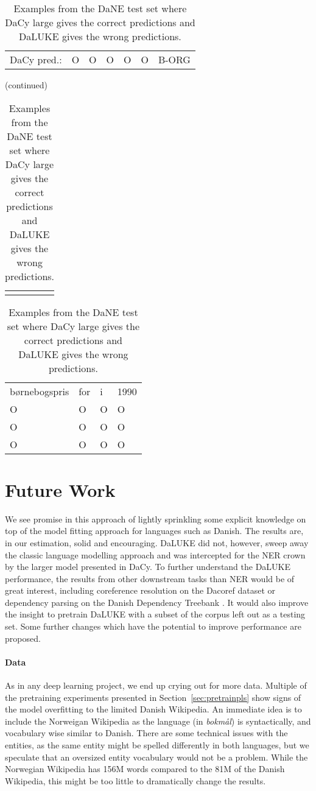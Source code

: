 \documentclass[main.tex]{subfiles}
\begin{document}
\begin{table}[H]
\begin{tabular}{l|llllll}
        DaCy pred.:   & O    & O       & O    & O  & O       & B-ORG
    \end{tabular}
    (continued)\\
    \begin{tabular}{c} %
        \quad \quad \quad \quad \quad \quad \quad \quad \quad \quad \quad
    \end{tabular}
    \begin{tabular}{llll}
        børnebogspris  & for  & i  & 1990  \\
        O              & O    & O  & O     \\\hline
        O              & O    & O  & O     \\
        O              & O    & O  & O
    \end{tabular}
    \caption{
        Examples from the DaNE test set where DaCy large gives the correct predictions and DaLUKE gives the wrong predictions.
    }
    \label{tab:dacyex}
\end{table}\noindent

\section{Future Work}
We see promise in this approach of lightly sprinkling some explicit knowledge on top of the model fitting approach for languages such as Danish.
The results are, in our estimation, solid and encouraging.
DaLUKE did not, however, sweep away the classic language modelling approach and was intercepted for the NER crown by the larger model presented in DaCy.
To further understand the DaLUKE performance, the results from other downstream tasks than NER would be of great interest, including coreference resolution on the Dacoref dataset \cite{kromann2004cdt, danlp2021} or dependency parsing on the Danish Dependency Treebank \cite{kromann2003ddt}.
It would also improve the insight to pretrain DaLUKE with a subset of the corpus left out as a testing set.
Some further changes which have the potential to improve performance are proposed.

\paragraph{Data}
As in any deep learning project, we end up crying out for more data.
Multiple of the pretraining experiments presented in Section~\ref{sec:pretrainpls} show signs of the model overfitting to the limited Danish Wikipedia.
An immediate idea is to include the Norweigan Wikipedia as the language (in \emph{bokmål}) is syntactically, and vocabulary wise similar to Danish.
There are some technical issues with the entities, as the same entity might be spelled differently in both languages, but we speculate that an oversized entity vocabulary would not be a problem.
While the Norwegian Wikipedia has 156M words \footnotemark compared to the 81M of the Danish Wikipedia, this might be too little to dramatically change the results.
\end{document}
